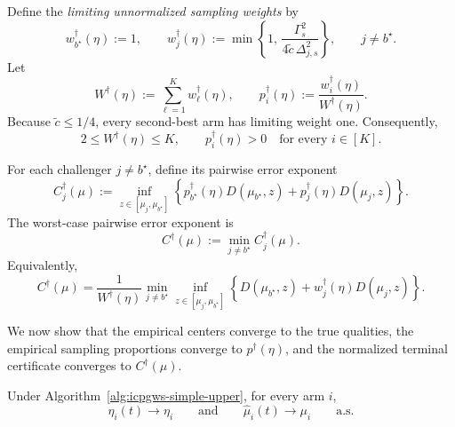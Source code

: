 \documentclass[10pt]{article}
\theoremstyle{plain}
\begin{document}
Define the \emph{limiting unnormalized sampling weights} by
\begin{equation}
\label{eq:simple-limiting-weights}
    w_{b^\star}^\dagger(\eta):=1,
    \qquad
    w_j^\dagger(\eta)
    :=
    \min\left\{
        1,\,
        \frac{\Gamma_s^2}
        {4\widetilde c\,\Delta_{j,s}^2}
    \right\},
    \qquad j\neq b^\star.
\end{equation}
Let
\[
    W^\dagger(\eta)
    :=
    \sum_{\ell=1}^K w_\ell^\dagger(\eta),
    \qquad
    p_i^\dagger(\eta)
    :=
    \frac{w_i^\dagger(\eta)}{W^\dagger(\eta)}.
\]
Because \(\widetilde c\le 1/4\), every second-best arm has limiting weight one.
Consequently,
\[
    2\le W^\dagger(\eta)\le K,
    \qquad
    p_i^\dagger(\eta)>0
    \quad\text{for every }i\in[K].
\]

For each challenger \(j\neq b^\star\), define its pairwise error exponent
\[
    C_j^\dagger(\mu)
    :=
    \inf_{z\in[\mu_j,\mu_{b^\star}]}
    \left\{
        p_{b^\star}^\dagger(\eta)D(\mu_{b^\star},z)
        +
        p_j^\dagger(\eta)D(\mu_j,z)
    \right\}.
\]
The worst-case pairwise error exponent is
\begin{equation}
\label{eq:Cdagger-simple-upper}
    C^\dagger(\mu)
    :=
    \min_{j\neq b^\star}C_j^\dagger(\mu).
\end{equation}
Equivalently,
\begin{equation}
\label{eq:Cdagger-unnormalized-simple-upper}
    C^\dagger(\mu)
    =
    \frac{1}{W^\dagger(\eta)}
    \min_{j\neq b^\star}
    \inf_{z\in[\mu_j,\mu_{b^\star}]}
    \left\{
        D(\mu_{b^\star},z)
        +
        w_j^\dagger(\eta)D(\mu_j,z)
    \right\}.
\end{equation}

We now show that the empirical centers converge to the true qualities, the
empirical sampling proportions converge to \(p^\dagger(\eta)\), and the
normalized terminal certificate converges to \(C^\dagger(\mu)\).


\begin{lemma}
\label{lem:center-consistency-simple-upper}
Under Algorithm~\ref{alg:icpgws-simple-upper}, for every arm \(i\),
\[
    \widehat \eta_i(t)\to \eta_i
    \qquad\text{and}\qquad
    \widehat \mu_i(t)\to \mu_i
    \qquad\text{a.s.}
\]
\end{lemma}
\end{document}
